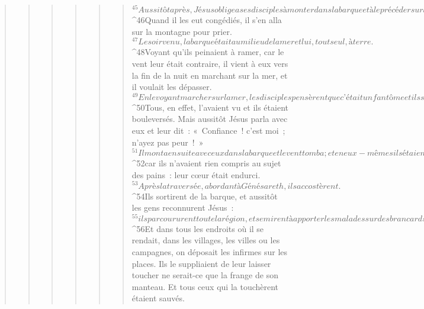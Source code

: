 \begin{verse}
\begin{verse}
\begin{verse}
\begin{verse}
\begin{verse}
\begin{verse}
${}^{45}Aussitôt après, Jésus obligea ses disciples à monter dans la barque et à le précéder sur l’autre rive, vers Bethsaïde, pendant que lui-même renvoyait la foule. 
${}^{46}Quand il les eut congédiés, il s’en alla sur la montagne pour prier. 
${}^{47}Le soir venu, la barque était au milieu de la mer et lui, tout seul, à terre. 
${}^{48}Voyant qu’ils peinaient à ramer, car le vent leur était contraire, il vient à eux vers la fin de la nuit en marchant sur la mer, et il voulait les dépasser. 
${}^{49}En le voyant marcher sur la mer, les disciples pensèrent que c’était un fantôme et ils se mirent à pousser des cris. 
${}^{50}Tous, en effet, l’avaient vu et ils étaient bouleversés. Mais aussitôt Jésus parla avec eux et leur dit : « Confiance ! c’est moi ; n’ayez pas peur ! » 
${}^{51}Il monta ensuite avec eux dans la barque et le vent tomba ; et en eux-mêmes ils étaient au comble de la stupeur, 
${}^{52}car ils n’avaient rien compris au sujet des pains : leur cœur était endurci.
${}^{53}Après la traversée, abordant à Génésareth, ils accostèrent. 
${}^{54}Ils sortirent de la barque, et aussitôt les gens reconnurent Jésus : 
${}^{55}ils parcoururent toute la région, et se mirent à apporter les malades sur des brancards là où l’on apprenait que Jésus se trouvait. 
${}^{56}Et dans tous les endroits où il se rendait, dans les villages, les villes ou les campagnes, on déposait les infirmes sur les places. Ils le suppliaient de leur laisser toucher ne serait-ce que la frange de son manteau. Et tous ceux qui la touchèrent étaient sauvés.
      

\end{verse}
\end{verse}
\end{verse}
\end{verse}
\end{verse}
\end{verse}
